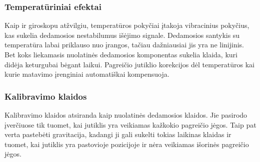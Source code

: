 \subsubsection{Temperatūriniai efektai}

Kaip ir giroskopu atžvilgiu, temperatūros pokyčiai įtakoja vibracinius pokyčius, kas sukelia dedamosios nestabilumus išėjimo signale. Dedamosios santykis su temperatūra labai priklauso nuo įrangos, tačiau dažniausiai jis yra ne linijinis. Bet koks liekamasis nuolatinės dedamosios komponentas sukelia klaida, kuri didėja keturgubai bėgant laikui. Pagreičio jutiklio korekcijos dėl temperatūros kai kurie matavimo įrenginiai automatiškai kompensuoja.

\subsubsection{Kalibravimo klaidos}

Kalibravimo klaidos atsiranda kaip nuolatinės dedamosios klaidos. Jie pasirodo įverčiuose tik tuomet, kai jutiklis yra veikiamas kažkokio pagreičio jėgos. Taip pat verta pastebėti gravitacija, kadangi ji gali sukelti tokias laikinas klaidas ir tuomet, kai jutiklis yra pastovioje pozicijoje ir nėra veikiamas išorinės pagreičio jėgos.

